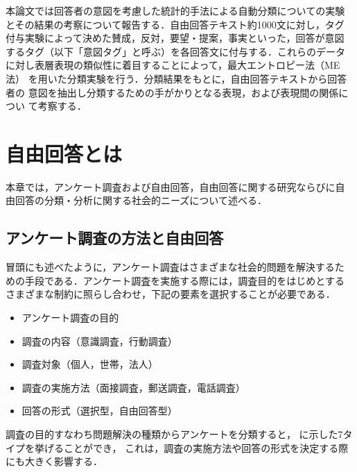 本論文では回答者の意図を考慮した統計的手法による自動分類についての実験
とその結果の考察について報告する．自由回答テキスト約1000文に対し，タグ
付与実験によって決めた賛成，反対，要望・提案，事実といった，回答が意図
するタグ（以下「意図タグ」と呼ぶ）を各回答文に付与する．これらのデータ
に対し表層表現の類似性に着目することによって，最大エントロピー法（ME法）
を用いた分類実験を行う．分類結果をもとに，自由回答テキストから回答者の
意図を抽出し分類するための手がかりとなる表現，および表現間の関係につい
て考察する．

\section{自由回答とは}
\label{sec:enquete}

本章では，アンケート調査および自由回答，自由回答に関する研究ならびに自
由回答の分類・分析に関する社会的ニーズについて述べる．

\subsection{アンケート調査の方法と自由回答}

冒頭にも述べたように，アンケート調査はさまざまな社会的問題を解決するた
めの手段である．アンケート調査を実施する際には，調査目的をはじめとする
さまざまな制約に照らし合わせ，下記の要素を選択することが必要である．

\begin{itemize}
\item アンケート調査の目的
\item 調査の内容（意識調査，行動調査）
\item 調査対象（個人，世帯，法人）
\item 調査の実施方法（面接調査，郵送調査，電話調査）
\item 回答の形式（選択型，自由回答型）
\end{itemize}

調査の目的すなわち問題解決の種類からアンケートを分類すると，
に示した7タイプを挙げることができ\cite{arima:87}，
これは，調査の実施方法や回答の形式を決定する際にも大きく影響する．

